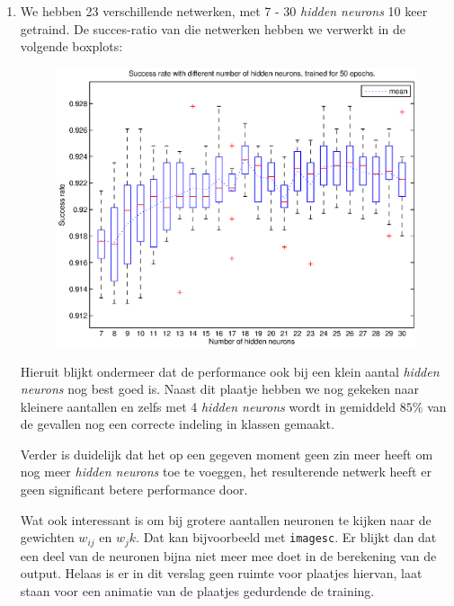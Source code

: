 \documentclass[a4paper,10pt,fleqn]{article}
\begin{document}
\begin{enumerate}[1.]
    \pagebreak
	\item We hebben 23 verschillende netwerken, met 7 - 30 \textit{hidden neurons} 10 keer getraind. De succes-ratio van die netwerken hebben we verwerkt in de volgende boxplots:
    \begin{figure}[!ht]
    	\centering
        \includegraphics[width=1\textwidth]{images/error-boxplot}
    \end{figure}
    Hieruit blijkt ondermeer dat de performance ook bij een klein aantal \textit{hidden neurons} nog best goed is. Naast dit plaatje hebben we nog gekeken naar kleinere aantallen en zelfs met 4 \textit{hidden neurons} wordt in gemiddeld $85\%$ van de gevallen nog een correcte indeling in klassen gemaakt.

    Verder is duidelijk dat het op een gegeven moment geen zin meer heeft om nog meer \textit{hidden neurons} toe te voeggen, het resulterende netwerk heeft er geen significant betere performance door.

    Wat ook interessant is om bij grotere aantallen neuronen te kijken naar de gewichten $w_{ij}$ en $w_jk$. Dat kan bijvoorbeeld met \verb|imagesc|. Er blijkt dan dat een deel van de neuronen bijna niet meer mee doet in de berekening van de output. Helaas is er in dit verslag geen ruimte voor plaatjes hiervan, laat staan voor een animatie van de plaatjes gedurdende de training.


\end{enumerate}
\end{document}
